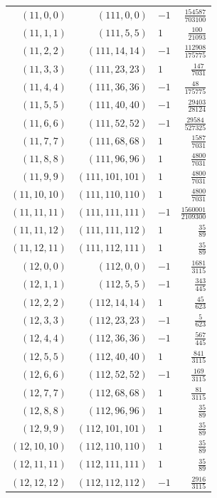 \begin{longtable}{rrlr}
$(11,0,0)$ & $(111,0,0)$ & $-1$ & $\frac{154587}{703100}$\\
$(11,1,1)$ & $(111,5,5)$ & $1$ & $\frac{100}{21093}$\\
$(11,2,2)$ & $(111,14,14)$ & $-1$ & $\frac{112908}{175775}$\\
$(11,3,3)$ & $(111,23,23)$ & $1$ & $\frac{147}{7031}$\\
$(11,4,4)$ & $(111,36,36)$ & $-1$ & $\frac{48}{175775}$\\
$(11,5,5)$ & $(111,40,40)$ & $-1$ & $\frac{29403}{28124}$\\
$(11,6,6)$ & $(111,52,52)$ & $-1$ & $\frac{29584}{527325}$\\
$(11,7,7)$ & $(111,68,68)$ & $1$ & $\frac{1587}{7031}$\\
$(11,8,8)$ & $(111,96,96)$ & $1$ & $\frac{4800}{7031}$\\
$(11,9,9)$ & $(111,101,101)$ & $1$ & $\frac{4800}{7031}$\\
$(11,10,10)$ & $(111,110,110)$ & $1$ & $\frac{4800}{7031}$\\
$(11,11,11)$ & $(111,111,111)$ & $-1$ & $\frac{1560001}{2109300}$\\
$(11,11,12)$ & $(111,111,112)$ & $1$ & $\frac{35}{89}$\\
$(11,12,11)$ & $(111,112,111)$ & $1$ & $\frac{35}{89}$\\
$(12,0,0)$ & $(112,0,0)$ & $-1$ & $\frac{1681}{3115}$\\
$(12,1,1)$ & $(112,5,5)$ & $-1$ & $\frac{343}{445}$\\
$(12,2,2)$ & $(112,14,14)$ & $1$ & $\frac{45}{623}$\\
$(12,3,3)$ & $(112,23,23)$ & $-1$ & $\frac{5}{623}$\\
$(12,4,4)$ & $(112,36,36)$ & $-1$ & $\frac{567}{445}$\\
$(12,5,5)$ & $(112,40,40)$ & $1$ & $\frac{841}{3115}$\\
$(12,6,6)$ & $(112,52,52)$ & $-1$ & $\frac{169}{3115}$\\
$(12,7,7)$ & $(112,68,68)$ & $1$ & $\frac{81}{3115}$\\
$(12,8,8)$ & $(112,96,96)$ & $1$ & $\frac{35}{89}$\\
$(12,9,9)$ & $(112,101,101)$ & $1$ & $\frac{35}{89}$\\
$(12,10,10)$ & $(112,110,110)$ & $1$ & $\frac{35}{89}$\\
$(12,11,11)$ & $(112,111,111)$ & $1$ & $\frac{35}{89}$\\
$(12,12,12)$ & $(112,112,112)$ & $-1$ & $\frac{2916}{3115}$\\
\end{longtable}
\endgroup
